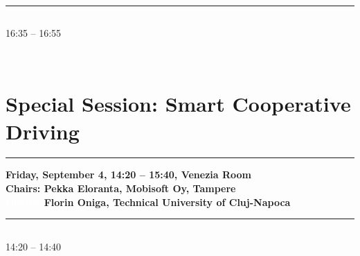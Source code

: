             
            \\ 
            \noindent\rule{\textwidth}{0.4pt}
\vspace*{-36pt}\subsection[ 
    	   {\bf Interacting with a Multi AGV System
           } \\
           {\it Elena Cardarelli, Lorenzo Sabattini, Valerio Digani, Cristian Secchi, Cesare Fantuzzi
           }
	]
	    {
            }
	    16:35 -- 16:55 \nopagebreak

            
            \\ 

\section{{\bf \large Special Session: %
Smart Cooperative Driving
}} \vspace{-15pt} %
\noindent\rule{\textwidth}{0.4pt} \nopagebreak
{\bf  
Friday, September 4, 14:20 -- 15:40, Venezia Room
} \\ \nopagebreak
{\bf  Chairs: 
Pekka Eloranta, Mobisoft Oy, Tampere
} \\ \nopagebreak 
{\bf  \textcolor{white}{Chairs:} 
Florin Oniga, Technical University of Cluj-Napoca
} \\ \nopagebreak 
\noindent\rule{\textwidth}{0.4pt} \nopagebreak

\vspace*{-36pt}\subsection[ 
    	   {\bf Sensing the Driving Environment with Smart Mobile Devices
           } \\
           {\it Radu Danescu, Razvan Itu, Andra Petrovai
           }
	]
	    {
            }
	    14:20 -- 14:40 \nopagebreak

